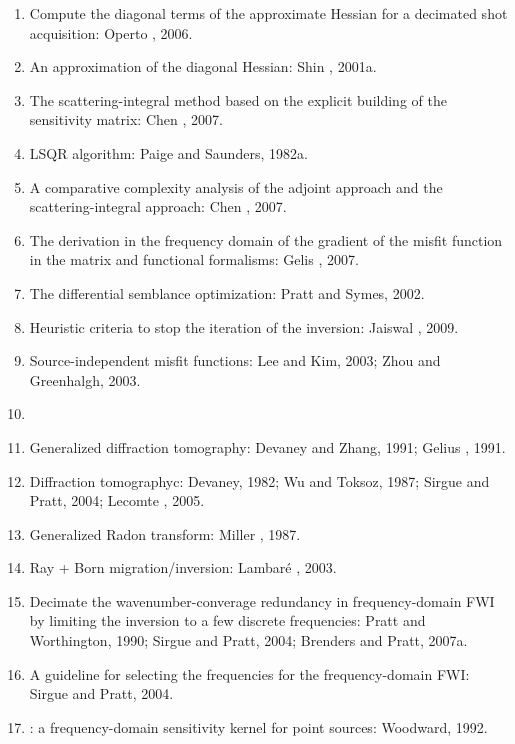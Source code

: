 \begin{enumerate}[\hspace{10mm}*]
  \item Compute the diagonal terms of the approximate Hessian
    for a decimated shot acquisition: Operto \etal, 2006.
  \item An approximation of the diagonal Hessian: Shin \etal, 2001a.
  \item The scattering-integral method based on the explicit building
    of the sensitivity matrix: Chen \etal, 2007.
  \item LSQR algorithm: Paige and Saunders, 1982a.
  \item A comparative complexity analysis of the adjoint approach and
    the scattering-integral approach: Chen \etal, 2007.
  \item The derivation in the frequency domain of the gradient of
    the misfit function in the matrix and functional formalisms:
    Gelis \etal, 2007.
  \item The differential semblance optimization: Pratt and Symes, 2002.
  \item Heuristic criteria to stop the iteration of the inversion:
    Jaiswal \etal, 2009.
  \item Source-independent misfit functions: Lee and Kim, 2003;
    Zhou and Greenhalgh, 2003.
  \item \sline
  \item Generalized diffraction tomography: Devaney and Zhang, 1991;
    Gelius \etal, 1991.
  \item Diffraction tomographyc: Devaney, 1982; Wu and Toksoz, 1987;
    Sirgue and Pratt, 2004; Lecomte \etal, 2005.
  \item Generalized Radon transform: Miller \etal, 1987.
  \item Ray + Born migration/inversion: Lambar\'e \etal, 2003.
  \item Decimate the wavenumber-converage redundancy in frequency-domain FWI
    by limiting the inversion to a few discrete frequencies:
    Pratt and Worthington, 1990; Sirgue and Pratt, 2004;
    Brenders and Pratt, 2007a.
  \item A guideline for selecting the frequencies for
    the frequency-domain FWI: Sirgue and Pratt, 2004.
  \item {}: a frequency-domain sensitivity kernel
    for point sources: Woodward, 1992.


























\end{enumerate}

